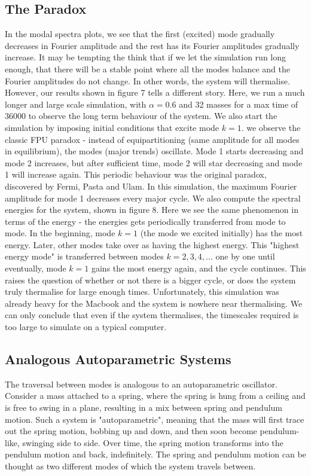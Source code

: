 \documentclass{article}
\begin{document}
\subsection{The Paradox}
In the modal spectra plots, we see that the first (excited) mode gradually decreases
in Fourier amplitude and the rest has its Fourier amplitudes gradually increase.
It may be tempting the think that if we let the simulation run long enough,
 that there will 
be a stable point where all the modes balance and the Fourier amplitudes do not change. In other words, 
the system will thermalise. However, our results shown in figure 7 tells a different story. Here, 
we run a much longer and large scale simulation, with $\alpha=0.6$ and 32 masses for a max time of 
36000 to observe the long term behaviour of the system. 
We also start the simulation by imposing initial conditions that excite mode $k=1$. 
 we observe the classic FPU paradox - 
instead of equipartitioning (same amplitude for all modes in equilibrium), 
the modes (major trends) oscillate. Mode 1 starts decreasing and 
mode 2 increases, but after sufficient time, mode 2 will star
 decreasing and mode 1 will increase again. 
This periodic behaviour was the original paradox, discovered by Fermi, Pasta and Ulam. 
In this simulation, the maximum Fourier amplitude for mode 1 decreases every major cycle.
We also compute the 
spectral energies for the system, shown in figure 8. Here we see the same phenomenon 
in terms of the energy - the energies gets 
periodically transferred from mode to mode. In the beginning,
 mode $k=1$ (the mode we excited initially) has the most energy. Later, 
other modes take over as having the highest energy. This "highest energy mode" is transferred 
between modes $k=2,3,4,...$ one by one until eventually, mode $k=1$ 
gains the most energy again, and the cycle continues. 
This raises the question of whether or not there is a bigger cycle, or does 
the system truly thermalise for large enough times. 
Unfortunately, this simulation was already heavy for the Macbook and the system is 
nowhere near thermalising. We can only conclude that even if the system thermalises,
the timescales required is too large to simulate on a typical computer. 
\subsection{Analogous Autoparametric Systems}
The traversal between modes is analogous to an autoparametric oscillator. 
Consider a mass attached to a spring, where the spring is hung from a ceiling and 
is free to swing in a plane, resulting in a mix between spring and pendulum motion. 
Such a system is "autoparametric", meaning that the mass will first trace out 
the spring motion, bobbing up and down, and then soon become pendulum-like,
 swinging side to side. Over time, the 
spring motion transforms into the pendulum motion and back, 
indefinitely.
The spring and pendulum motion can be 
thought as two different modes of which the system travels between.
\end{document}
